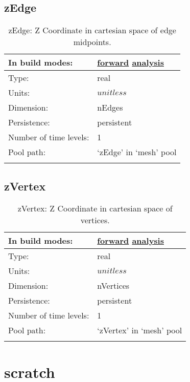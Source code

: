 \subsection[zEdge]{zEdge}
\label{subsec:var_sec_mesh_zEdge}
\begin{center}
\begin{longtable}{| p{2.0in} | p{4.0in} |}
        \hline 
        In build modes: & \hyperref[subsec:forward_var_tab_mesh]{forward} \hyperref[subsec:analysis_var_tab_mesh]{analysis} \\
        \hline 
        Type: & real \\
        \hline 
        Units: & $unitless$ \\
        \hline 
        Dimension: & nEdges \\
        \hline 
        Persistence: & persistent \\
        \hline 
        Number of time levels: & 1 \\
        \hline 
            Pool path: & `zEdge' in `mesh' pool \\
		 \hline 
    \caption{zEdge: Z Coordinate in cartesian space of edge midpoints.}
\end{longtable}
\end{center}
\subsection[zVertex]{zVertex}
\label{subsec:var_sec_mesh_zVertex}
\begin{center}
\begin{longtable}{| p{2.0in} | p{4.0in} |}
        \hline 
        In build modes: & \hyperref[subsec:forward_var_tab_mesh]{forward} \hyperref[subsec:analysis_var_tab_mesh]{analysis} \\
        \hline 
        Type: & real \\
        \hline 
        Units: & $unitless$ \\
        \hline 
        Dimension: & nVertices \\
        \hline 
        Persistence: & persistent \\
        \hline 
        Number of time levels: & 1 \\
        \hline 
            Pool path: & `zVertex' in `mesh' pool \\
		 \hline 
    \caption{zVertex: Z Coordinate in cartesian space of vertices.}
\end{longtable}
\end{center}
\section[scratch]{scratch}
\label{sec:var_sec_scratch}
